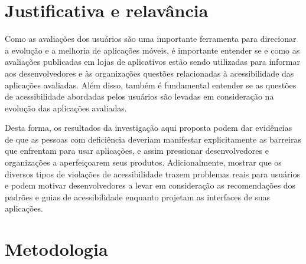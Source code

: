 \section{Justificativa e relavância}

Como as avaliações dos usuários são uma importante ferramenta para direcionar a evolução e a melhoria de aplicações móveis, 
é importante entender se e como as avaliações publicadas em lojas de aplicativos estão sendo utilizadas para informar aos desenvolvedores e às organizações questões relacionadas à acessibilidade das aplicações avaliadas. 
Além disso, também é fundamental entender se as questões de acessibilidade abordadas pelos usuários são levadas em consideração na evolução das aplicações avaliadas. 

Desta forma, os resultados da investigação aqui proposta podem dar evidências de que as pessoas com deficiência deveriam manifestar explicitamente as barreiras que enfrentam para usar aplicações, e assim pressionar desenvolvedores e organizações a aperfeiçoarem seus produtos.
Adicionalmente, mostrar que os diversos tipos de violações de acessibilidade trazem problemas reais para usuários e podem motivar desenvolvedores a levar em consideração as recomendações dos padrões e guias de acessibilidade enquanto projetam as interfaces de suas aplicações.


\section{Metodologia}




